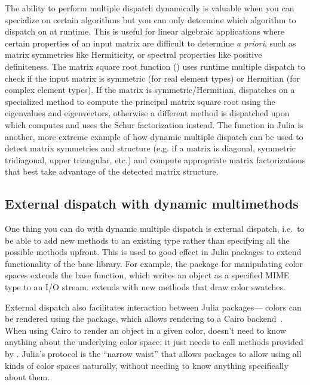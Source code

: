 The ability to perform multiple dispatch dynamically is valuable
when you can specialize on certain algorithms but you can only
determine which algorithm to dispatch on at runtime. This is useful
for linear algebraic applications where certain properties of an input
matrix are difficult to determine \textit{a priori}, such as matrix
symmetries like Hermiticity, or spectral properties like positive
definiteness. The matrix square root function () uses
runtime multiple dispatch to check if the input matrix is symmetric
(for real element types) or Hermitian (for complex element types). If
the matrix is symmetric/Hermitian,  dispatches on a
specialized method to compute the principal matrix square root using
the eigenvalues and eigenvectors, otherwise a different method is
dispatched upon which computes and uses the Schur factorization
instead. The  function in Julia is another, more
extreme example of how dynamic multiple dispatch can be used to detect
matrix symmetries and structure (e.g. if a matrix is diagonal,
symmetric tridiagonal, upper triangular, etc.) and compute appropriate
matrix factorizations that best take advantage of the detected matrix
structure.



\subsection{External dispatch with dynamic multimethods}

One thing you can do with dynamic multiple dispatch is external dispatch,
i.e.\ to be able to add new methods to an existing type rather than
specifying all the possible methods upfront. This is used to good effect
in Julia packages to extend functionality of the base library. For example,
the package  for manipulating color spaces extends the
 base function, which writes an object as a specified
MIME type\cite{mimerfc} to an I/O stream.  extends
 with new methods that draw color swatches.


External dispatch also facilitates interaction between Julia packages--- 
colors can be rendered using the  package,
which allows rendering to a Cairo backend~\cite{cairographics}.
When using Cairo to render an object in a given color, 
doesn't need to know anything about the underlying color space; it just
needs to call  methods provided by .
Julia's  protocol is the ``narrow waist'' that allows
packages to allow using all kinds of color spaces naturally, without
needing to know anything specifically about them.

